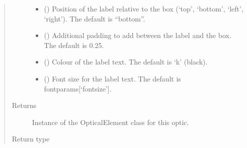 \documentclass[letterpaper,10pt,english]{sphinxmanual}
\begin{document}
\begin{fulllineitems}
\begin{fulllineitems}
\begin{quote}
\begin{description}
\begin{itemize}
\item {} 
\sphinxAtStartPar
{} (\sphinxstyleliteralemphasis{\sphinxupquote{, }}) \textendash{} Position of the label relative to the box (‘top’, ‘bottom’, ‘left’, ‘right’).
The default is “bottom”.

\item {} 
\sphinxAtStartPar
{} (\sphinxstyleliteralemphasis{\sphinxupquote{, }}) \textendash{} Additional padding to add between the label and the box. The default is 0.25.

\item {} 
\sphinxAtStartPar
{} (\sphinxstyleliteralemphasis{\sphinxupquote{, }}) \textendash{} Colour of the label text. The default is ‘k’ (black).

\item {} 
\sphinxAtStartPar
{} (\sphinxstyleliteralemphasis{\sphinxupquote{, }}) \textendash{} Font size for the label text. The default is fontparams{[}‘fontsize’{]}.

\end{itemize}

\item[{Returns}] \leavevmode
\sphinxAtStartPar
Instance of the OpticalElement class for this optic.

\item[{Return type}] \leavevmode
\sphinxAtStartPar
{\hyperref[\detokenize{index:pyopticaltable.OpticalElement}]{}}

\end{description}\end{quote}

\end{fulllineitems}



\end{fulllineitems}
\end{document}
